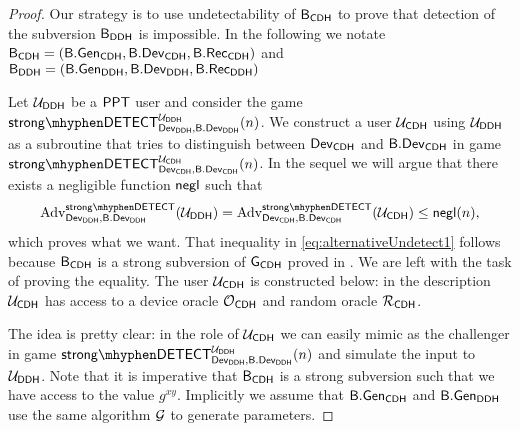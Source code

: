 \begin{proof}

Our strategy is to use undetectability of $\mathsf{B}_{\mathsf{CDH}}$ to prove that detection of the subversion $\mathsf{B}_{\mathsf{DDH}}$ is impossible. In the following we notate $\mathsf{B}_{\mathsf{CDH}} = \left( \mathsf{B}.\mathsf{Gen}_{\mathsf{CDH}}, \mathsf{B}.\mathsf{Dev}_{\mathsf{CDH}}, \mathsf{B}.\mathsf{Rec}_{\mathsf{CDH}} \right)$ and $\mathsf{B}_{\mathsf{DDH}} = \left( \mathsf{B}.\mathsf{Gen}_{\mathsf{DDH}}, \mathsf{B}.\mathsf{Dev}_{\mathsf{DDH}}, \mathsf{B}.\mathsf{Rec}_{\mathsf{DDH}} \right)$

Let $\mathcal{U}_{\mathsf{DDH}}$ be a $\mathsf{PPT}$ user and consider the game $\strongdetect{\dev_{\DDH}}{\bbdev_{\DDH}}{\user_{\DDH}}$. We construct a user $\mathcal{U}_{\mathsf{CDH}}$ using $\mathcal{U}_{\mathsf{DDH}}$ as a subroutine that tries to distinguish between $\operatorname{\mathsf{Dev}}_{\mathsf{CDH}}$ and $\mathsf{B}.\mathsf{Dev}_{\mathsf{CDH}}$ in game $\strongdetect{\dev_{\CDH}}{\bbdev_{\CDH}}{\user_{\CDH}}$. 
In the sequel we will argue that there exists a negligible function $\operatorname{\mathsf{negl}}$ such that
\begin{align}
\label{eq:alternativeUndetect1}
	\adv_{\dev_{\DDH},\bbdev_{\DDH}}^{\strongdetectplain}(\user_{\DDH}) = \adv_{\dev_{\CDH},\bbdev_{\CDH}}^{\strongdetectplain}(\user_{\CDH}) \leq \negl(n),
\end{align}
which proves what we want. That inequality in \ref{eq:alternativeUndetect1} follows because $\mathsf{B}_{\mathsf{CDH}}$ is a strong subversion of $\operatorname{\mathsf{G}}_{\mathsf{CDH}}$ proved in . We are left with the task of proving the equality. The user $\mathcal{U}_{\mathsf{CDH}}$ is constructed below: in the description $\mathcal{U}_{\mathsf{CDH}}$ has access to a device oracle $\operatorname{\mathcal{O}}_{\mathsf{CDH}}$ and random oracle $\operatorname{\mathcal{R}}_{\mathsf{CDH}}$. 

The idea is pretty clear: in the role of $\mathcal{U}_{\mathsf{CDH}}$ we can easily mimic as the challenger in game $\strongdetect{\dev_{\DDH}}{\bbdev_{\DDH}}{\user_{\DDH}}$ and simulate the input to $\mathcal{U}_{\mathsf{DDH}}$. Note that it is imperative that $\mathsf{B}_{\mathsf{CDH}}$ is a strong subversion such that we have access to the value $g^{xy}$. Implicitly we assume that $\mathsf{B}.\mathsf{Gen}_{\mathsf{CDH}}$ and $\mathsf{B}.\mathsf{Gen}_{\mathsf{DDH}}$ use the same algorithm $\operatorname{\mathcal{G}}$ to generate parameters. 


\end{proof}
